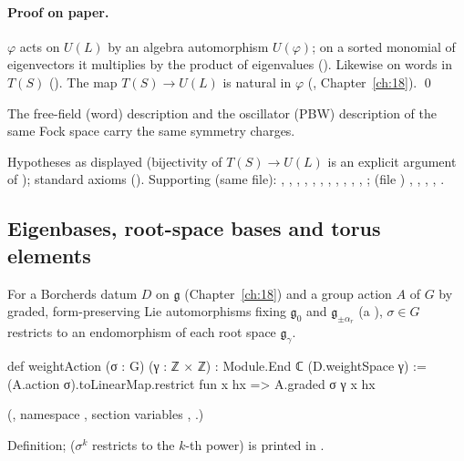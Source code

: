 \paragraph{Proof on paper.}  $\varphi$ acts on $U(L)$ by an algebra automorphism $U(\varphi)$; on a sorted monomial of eigenvectors it
multiplies by the product of eigenvalues ().  Likewise on words in $T(S)$
().  The map $T(S)\to U(L)$ is natural in $\varphi$ (,
Chapter~\ref{ch:18}). \qed
\begin{physics}The free-field (word) description and the oscillator (PBW) description of the same Fock space carry the same
symmetry charges.\end{physics}
\begin{status}Hypotheses as displayed (bijectivity of $T(S)\to U(L)$ is an explicit argument of ); standard
axioms ().  Supporting (same file): , ,
, , , , ,
, , ,
, ; (file )
, , , ,
.\end{status}

\subsection{Eigenbases, root-space bases and torus elements}

\begin{definition}\label{ch19:def:weightAction}
For a Borcherds datum $D$ on $\mathfrak g$ (Chapter~\ref{ch:18}) and a group action $A$ of $G$ by graded, form-preserving Lie
automorphisms fixing $\mathfrak g_0$ and $\mathfrak g_{\pm\alpha_r}$ (a ), $\sigma\in G$ restricts to an endomorphism of each
root space $\mathfrak g_\gamma$.
\end{definition}
\begin{leancode}
def weightAction (σ : G) (γ : ℤ × ℤ) : Module.End ℂ (D.weightSpace γ) :=
  (A.action σ).toLinearMap.restrict fun x hx => A.graded σ γ x hx
\end{leancode}
(, namespace , section variables
, .)
\begin{status}Definition;  ($\sigma^k$ restricts to the $k$-th power) is printed in
.\end{status}

